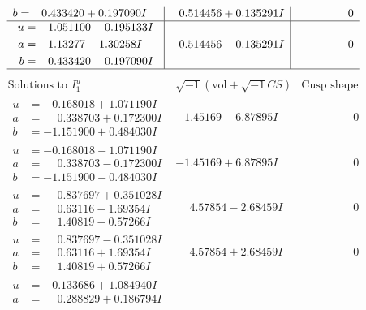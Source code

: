 \documentclass[1p]{elsarticle_modified}
\theoremstyle{definition}
\newcommand{\I}{\sqrt{-1}}
\begin{document}
$$\begin{array}{c|c|c}
\begin{aligned}
b &= \phantom{-}0.433420 + 0.197090 I\end{aligned}
 & \phantom{-}0.514456 + 0.135291 I & \phantom{-0.000000 } 0 \\ \hline\begin{aligned}
u &= -1.051100 - 0.195133 I \\
a &= \phantom{-}1.13277 - 1.30258 I \\
b &= \phantom{-}0.433420 - 0.197090 I\end{aligned}
 & \phantom{-}0.514456 - 0.135291 I & \phantom{-0.000000 } 0\\
 \hline 
 \end{array}$$\newpage$$\begin{array}{c|c|c}  
\text{Solutions to }I^u_{1}& \I (\text{vol} + \sqrt{-1}CS) & \text{Cusp shape}\\
 \hline 
\begin{aligned}
u &= -0.168018 + 1.071190 I \\
a &= \phantom{-}0.338703 + 0.172300 I \\
b &= -1.151900 + 0.484030 I\end{aligned}
 & -1.45169 - 6.87895 I & \phantom{-0.000000 } 0 \\ \hline\begin{aligned}
u &= -0.168018 - 1.071190 I \\
a &= \phantom{-}0.338703 - 0.172300 I \\
b &= -1.151900 - 0.484030 I\end{aligned}
 & -1.45169 + 6.87895 I & \phantom{-0.000000 } 0 \\ \hline\begin{aligned}
u &= \phantom{-}0.837697 + 0.351028 I \\
a &= \phantom{-}0.63116 - 1.69354 I \\
b &= \phantom{-}1.40819 - 0.57266 I\end{aligned}
 & \phantom{-}4.57854 - 2.68459 I & \phantom{-0.000000 } 0 \\ \hline\begin{aligned}
u &= \phantom{-}0.837697 - 0.351028 I \\
a &= \phantom{-}0.63116 + 1.69354 I \\
b &= \phantom{-}1.40819 + 0.57266 I\end{aligned}
 & \phantom{-}4.57854 + 2.68459 I & \phantom{-0.000000 } 0 \\ \hline\begin{aligned}
u &= -0.133686 + 1.084940 I \\
a &= \phantom{-}0.288829 + 0.186794 I \\

\end{aligned}
\end{array}$$
\end{document}

